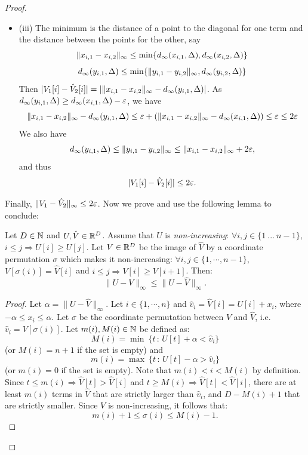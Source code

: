 \begin{proof}
\begin{itemize}
\item (iii) The minimum is the distance of a point to the diagonal for one term 
and the distance between the points for the other, say 
$$\|x_{i,1}-x_{i,2}\|_\infty\leq \min\{d_\infty(x_{i,1},\Delta),d_\infty(x_{i,2},\Delta)\}$$
$$d_\infty(y_{i,1},\Delta)\leq \min\{\|y_{i,1}-y_{i,2}\|_\infty,d_\infty(y_{i,2},\Delta)\}$$ 
Then $|V_1[i]-\hat{V}_2[i]|=|\|x_{i,1}-x_{i,2}\|_\infty-d_\infty(y_{i,1},\Delta)|$. 
As $d_\infty(y_{i,1},\Delta)\geq d_\infty(x_{i,1},\Delta)-\varepsilon$, we have 
$$\|x_{i,1}-x_{i,2}\|_\infty-d_\infty(y_{i,1},\Delta)\leq\varepsilon+(\|x_{i,1}-x_{i,2}\|_\infty-d_\infty(x_{i,1},\Delta))\leq\varepsilon\leq 2\varepsilon$$
We also have 
$$d_\infty(y_{i,1},\Delta)\leq \|y_{i,1}-y_{i,2}\|_\infty\leq \|x_{i,1}-x_{i,2}\|_\infty+2\varepsilon,$$
and thus
$$|V_1[i]-\hat{V}_2[i]|\leq 2\varepsilon.$$ 
\end{itemize}

Finally, $\|V_1-\hat{V}_2\|_\infty\leq 2\varepsilon$. 
Now we prove and use the following lemma to conclude:

\begin{lem}\label{interm}
Let $D\in\mathbb{N}$ and $U,\hat V\in\mathbb{R}^D$. 
Assume that $U$ is {\em non-increasing}: $\forall i,j\in \{1\ ...\ n-1\}$, $i\leq j \Rightarrow U[i]\geq U[j]$.
Let $V\in\mathbb{R}^D$ be the image of $\hat V$ by a coordinate permutation $\sigma$ which 
makes it non-increasing: $\forall i,j\in \{1,\cdots,n-1\}$, $V[\sigma(i)]=\hat V[i]$ and 
$i\leq j \Rightarrow V[i]\geq V[i+1]$. Then:
$$\|U-V\|_\infty\leq\|U-\hat V\|_\infty.$$ 
\end{lem}

\begin{proof}
Let $\alpha=\|U-\hat V\|_\infty$.
Let $i\in\{1,\cdots,n\}$ and $\hat v_i=\hat V[i]= U[i] + x_i$, 
where $-\alpha\leq x_i\leq\alpha$. 
Let $\sigma$ be the coordinate permutation between $V$ and $\hat V$, i.e. $\hat v_i=V[\sigma(i)]$.
Let $m(i),M(i)\in\mathbb{N}$ be defined as:
$$M(i)=\min\ \{t\,:\,U[t]+\alpha<\hat v_i\}$$
(or $M(i)=n+1$ if the set is empty) and
$$m(i)=\max\ \{t\,:\,U[t]-\alpha> \hat v_i\}$$
(or $m(i)=0$ if the set is empty). Note that $m(i)<i<M(i)$ by definition.
Since $t\leq m(i)\Rightarrow \hat V[t]>\hat V[i]$ and  $t\geq M(i)\Rightarrow \hat V[t]<\hat V[i]$,
there are at least $m(i)$ terms in $\hat V$ that are strictly larger than $\hat v_i$, and $D-M(i)+1$
that are strictly smaller. Since $V$ is non-increasing, it follows that:
$$m(i)+1\leq \sigma(i) \leq M(i)-1.$$


\end{proof}
\end{proof}
